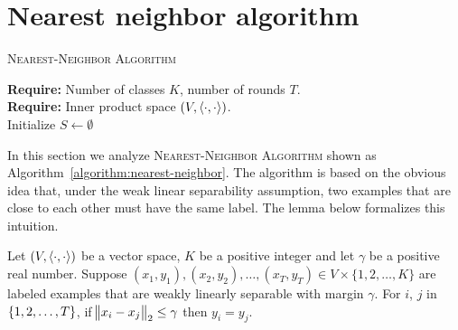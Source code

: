 \section{Nearest neighbor algorithm}
\label{section:nearest-neighbor-algorithm}

\begin{algorithm}[H]
\SetAlgoLined
\LinesNumbered
\setcounter{AlgoLine}{0}
\caption{\textsc{Nearest-Neighbor Algorithm}
\label{algorithm:nearest-neighbor}
}
\textbf{Require:} Number of classes $K$, number of rounds $T$. \\
\textbf{Require:} Inner product space $(V,\left\langle \cdot, \cdot \right\rangle)$. \\
\nl Initialize $S \gets \emptyset$ \\
\nl {}
\end{algorithm}

In this section we analyze \textsc{Nearest-Neighbor Algorithm} shown as
Algorithm~\ref{algorithm:nearest-neighbor}. The algorithm is based on the obvious
idea that, under the weak linear separability assumption, two examples that are close to each
other must have the same label. The lemma below formalizes this intuition.

\begin{lemma}
\label{lemma:non-separation-lemma}
Let $(V,\left\langle \cdot, \cdot \right\rangle)$ be a vector space, $K$ be a positive integer and let
$\gamma$ be a positive real number. Suppose $(x_1,y_1), (x_2,y_2), \dots, (x_T,
y_T) \in V \times \{1,2,\dots,K\}$ are labeled examples that are weakly linearly
separable with margin $\gamma$. For $i$, $j$ in $\cbr{1,2,\dots,T}$, if
$\norm{x_i - x_j}_2 \le \gamma$ then $y_i = y_j$.
\end{lemma}

